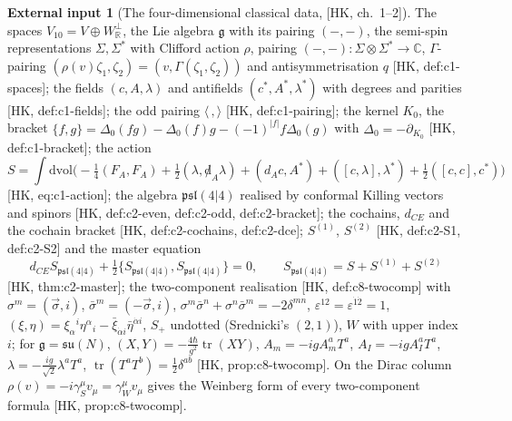 \documentclass[11pt]{article}
\theoremstyle{definition}
\newtheorem{axiom}[definition]{External input}
\numberwithin{equation}{section}
\begin{document}
\begin{axiom}[The four-dimensional classical data, {[HK, ch.~1--2]}]
\label{ax:hk}
The spaces $V_{10}=V\oplus W_{\mathbb R}^\perp$, the Lie algebra $\mathfrak g$ with its pairing $(-,-)$, the semi-spin representations $\Sigma,\Sigma^*$ with Clifford action $\rho$, pairing $(-,-)\colon\Sigma\otimes\Sigma^*\to\mathbb C$, $\Gamma$-pairing $(\rho(v)\zeta_1,\zeta_2)=(v,\Gamma(\zeta_1,\zeta_2))$ and antisymmetrisation $q$ [HK, def:c1-spaces]; the fields $(c,A,\lambda)$ and antifields $(c^*,A^*,\lambda^*)$ with degrees and parities [HK, def:c1-fields]; the odd pairing $\langle\,,\rangle$ [HK, def:c1-pairing]; the kernel $K_0$, the bracket $\{f,g\}=\Delta_0(fg)-\Delta_0(f)g-(-1)^{|f|}f\Delta_0(g)$ with $\Delta_0=-\partial_{K_0}$ [HK, def:c1-bracket]; the action
\begin{equation}
S=\int\mathrm{dvol}\Big(-\tfrac14(F_A,F_A)+\tfrac12(\lambda,{\not d}_A\lambda)+(d_Ac,A^*)+([c,\lambda],\lambda^*)+\tfrac12([c,c],c^*)\Big)
\label{eq:S4}
\end{equation}
[HK, eq:c1-action]; the algebra $\mathfrak{psl}(4|4)$ realised by conformal Killing vectors and spinors [HK, def:c2-even, def:c2-odd, def:c2-bracket]; the cochains, $d_{CE}$ and the cochain bracket [HK, def:c2-cochains, def:c2-dce]; $S^{(1)}$, $S^{(2)}$ [HK, def:c2-S1, def:c2-S2] and the master equation
\begin{equation}
d_{CE}S_{\mathfrak{psl}(4|4)}+\tfrac12\{S_{\mathfrak{psl}(4|4)},S_{\mathfrak{psl}(4|4)}\}=0,\qquad S_{\mathfrak{psl}(4|4)}=S+S^{(1)}+S^{(2)}
\label{eq:MC4}
\end{equation}
[HK, thm:c2-master]; the two-component realisation [HK, def:c8-twocomp] with $\sigma^m=(\vec\sigma,i)$, $\bar\sigma^m=(-\vec\sigma,i)$, $\sigma^m\bar\sigma^n+\sigma^n\bar\sigma^m=-2\delta^{mn}$, $\varepsilon^{12}=\varepsilon^{\dot1\dot2}=1$, $(\xi,\eta)=\xi_\alpha{}^i\eta^\alpha{}_i-\bar\xi_{\dot\alpha i}\bar\eta^{\dot\alpha i}$, $S_+$ undotted (Srednicki's $(2,1)$), $W$ with upper index $i$; for $\mathfrak g=\mathfrak{su}(N)$, $(X,Y)=-\tfrac{4\hbar}{g^2}\operatorname{tr}(XY)$, $A_m=-igA^a_mT^a$, $A_I=-igA^a_IT^a$, $\lambda=-\tfrac{ig}{\sqrt2}\lambda^aT^a$, $\operatorname{tr}(T^aT^b)=\tfrac12\delta^{ab}$ [HK, prop:c8-twocomp]. On the Dirac column $\rho(v)=-i\gamma_S^\mu v_\mu=\gamma_W^\mu v_\mu$ gives the Weinberg form of every two-component formula [HK, prop:c8-twocomp].
\end{axiom}
\end{document}
